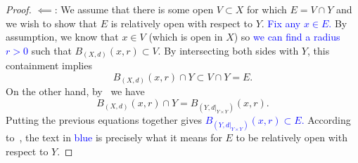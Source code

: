 \begin{prop}
\begin{proof}
	$\impliedby$: We assume that there is some open $V\subset X$ for which $E = V\cap Y$ and we wish to show that $E$ is relatively open with respect to $Y$. \textcolor{blue}{Fix any $x \in E$.} By assumption, we know that $x \in V$ (which is open in $X$) so \textcolor{blue}{we can find a radius $r>0$} such that $B_{(X,d)}(x,r)\subset V$. By intersecting both sides with $Y$, this containment implies
	\[
	B_{(X,d)}(x,r)\cap Y \subset V \cap Y = E.
	\]
	On the other hand, by~ we have
	\[
	B_{(X,d)}(x,r)\cap Y = B_{(Y,d|_{Y\times Y})}(x,r).
	\]
	Putting the previous equations together gives \textcolor{blue}{$B_{(Y,d|_{Y\times Y})}(x,r) \subset E$.} According to~, the text in \textcolor{blue}{blue} is precisely what it means for $E$ to be relatively open with respect to $Y$.
\end{proof}
\end{prop}